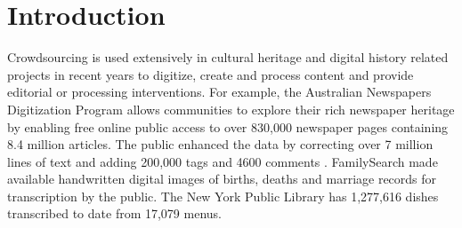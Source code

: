 \documentclass[letterpaper]{article}
\begin{document}
\section{Introduction}
\label{sec:intro}

Crowdsourcing is used extensively in cultural heritage and digital history related projects in recent years to 
%
digitize, create and process content and provide editorial or processing interventions. For example, the Australian Newspapers Digitization Program \cite{ADNP} allows communities to explore their rich newspaper heritage by enabling free online public access to over 830,000 newspaper pages containing 8.4 million articles. The public enhanced the data by correcting over 7 million lines of text and adding 200,000 tags and 4600 comments \cite{holley_09}. 
FamilySearch \cite{famSearch} made available handwritten digital images of births, deaths and marriage records for transcription by the public. The New York Public Library has 1,277,616 dishes transcribed to date from 17,079 menus. 
\end{document}

